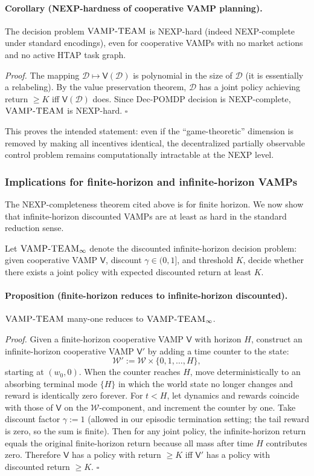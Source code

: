 \paragraph{Corollary (NEXP-hardness of cooperative VAMP planning).}
The decision problem \(\textsc{VAMP-TEAM}\) is NEXP-hard (indeed NEXP-complete under standard encodings), even for cooperative VAMPs with no market actions and no active HTAP task graph.

\emph{Proof.} The mapping \(\mathcal D \mapsto \mathsf V(\mathcal D)\) is polynomial in the size of \(\mathcal D\) (it is essentially a relabeling). By the value preservation theorem, \(\mathcal D\) has a joint policy achieving return \(\ge K\) iff \(\mathsf V(\mathcal D)\) does. Since Dec-POMDP decision is NEXP-complete, \(\textsc{VAMP-TEAM}\) is NEXP-hard. \(\square\)

This proves the intended statement: even if the ``game-theoretic'' dimension is removed by making all incentives identical, the decentralized partially observable control problem remains computationally intractable at the NEXP level.

\subsubsection{Implications for finite-horizon and infinite-horizon VAMPs}

The NEXP-completeness theorem cited above is for finite horizon. We now show that infinite-horizon discounted VAMPs are at least as hard in the standard reduction sense.

Let \(\textsc{VAMP-TEAM}_\infty\) denote the discounted infinite-horizon decision problem: given cooperative VAMP \(\mathsf V\), discount \(\gamma\in(0,1]\), and threshold \(K\), decide whether there exists a joint policy with expected discounted return at least \(K\).

\paragraph{Proposition (finite-horizon reduces to infinite-horizon discounted).}
\(\textsc{VAMP-TEAM}\) many-one reduces to \(\textsc{VAMP-TEAM}_\infty\).

\emph{Proof.} Given a finite-horizon cooperative VAMP \(\mathsf V\) with horizon \(H\), construct an infinite-horizon cooperative VAMP \(\mathsf V'\) by adding a time counter to the state:
\[
\mathcal W' := \mathcal W \times \{0,1,\dots,H\},
\]
starting at \((w_0,0)\). When the counter reaches \(H\), move deterministically to an absorbing terminal mode \(\{H\}\) in which the world state no longer changes and reward is identically zero forever. For \(t<H\), let dynamics and rewards coincide with those of \(\mathsf V\) on the \(\mathcal W\)-component, and increment the counter by one. Take discount factor \(\gamma:=1\) (allowed in our episodic termination setting; the tail reward is zero, so the sum is finite). Then for any joint policy, the infinite-horizon return equals the original finite-horizon return because all mass after time \(H\) contributes zero. Therefore \(\mathsf V\) has a policy with return \(\ge K\) iff \(\mathsf V'\) has a policy with discounted return \(\ge K\). \(\square\)

